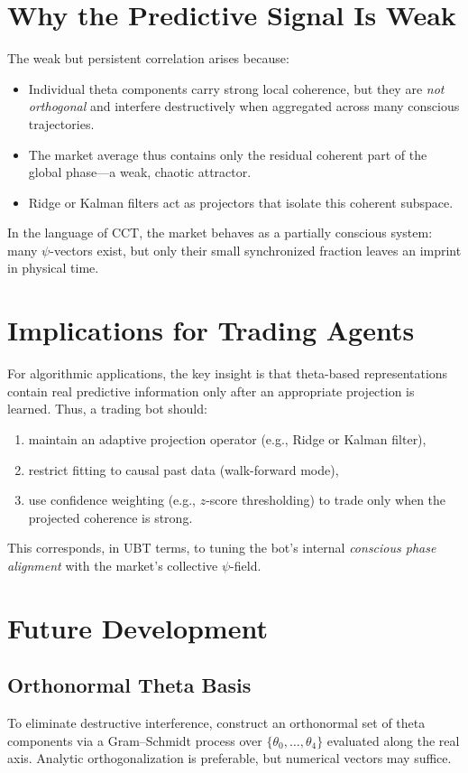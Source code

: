 \documentclass[12pt]{article}
\begin{document}
\section{Why the Predictive Signal Is Weak}
The weak but persistent correlation arises because:
\begin{itemize}
  \item Individual theta components carry strong local coherence,
        but they are \emph{not orthogonal} and interfere destructively
        when aggregated across many conscious trajectories.
  \item The market average thus contains only the residual coherent part
        of the global phase---a weak, chaotic attractor.
  \item Ridge or Kalman filters act as projectors that isolate this coherent subspace.
\end{itemize}
In the language of CCT, the market behaves as a partially conscious system:
many $\psi$-vectors exist, but only their small synchronized fraction leaves
an imprint in physical time.

\section{Implications for Trading Agents}
For algorithmic applications, the key insight is that
theta-based representations contain real predictive information
only after an appropriate projection is learned.
Thus, a trading bot should:
\begin{enumerate}
  \item maintain an adaptive projection operator (e.g., Ridge or Kalman filter),
  \item restrict fitting to causal past data (walk-forward mode),
  \item use confidence weighting (e.g., $z$-score thresholding)
        to trade only when the projected coherence is strong.
\end{enumerate}
This corresponds, in UBT terms, to tuning the bot’s internal
\emph{conscious phase alignment} with the market’s collective $\psi$-field.

\section{Future Development}
\subsection*{Orthonormal Theta Basis}
To eliminate destructive interference, construct an orthonormal set
of theta components via a Gram--Schmidt process
over $\{\theta_0,\ldots,\theta_4\}$ evaluated along the real axis.
Analytic orthogonalization is preferable, but numerical vectors may suffice.
\end{document}
